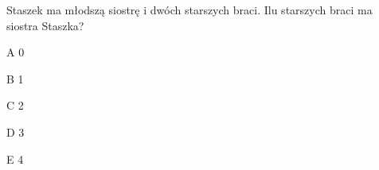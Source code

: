 \begin{tresc}
Staszek ma młodszą siostrę i dwóch starszych braci. Ilu starszych braci ma siostra Staszka?
\end{tresc}
\begin{wariant}{A} 0 \end{wariant}
\begin{wariant}{B} 1 \end{wariant}
\begin{wariant}{C} 2 \end{wariant}
\begin{wariant}{D} 3 \end{wariant}
\begin{wariant}{E} 4 \end{wariant}
